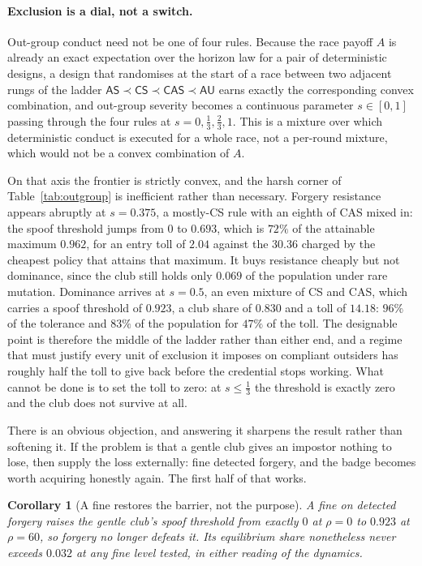 \documentclass[11pt,a4paper]{article}
\newtheorem{corollary}[theorem]{Corollary}
\theoremstyle{definition}
\newcommand{\AS}{\textsf{AS}}
\newcommand{\CS}{\textsf{CS}}
\newcommand{\CAS}{\textsf{CAS}}
\newcommand{\AU}{\textsf{AU}}
\begin{document}
\paragraph{Exclusion is a dial, not a switch.}
Out-group conduct need not be one of four rules. Because the race payoff $A$ is
already an exact expectation over the horizon law for a pair of deterministic
designs, a design that randomises at the start of a race between two adjacent
rungs of the ladder $\AS \prec \CS \prec \CAS \prec \AU$ earns exactly the
corresponding convex combination, and out-group severity becomes a continuous
parameter $s \in [0,1]$ passing through the four rules at
$s = 0, \tfrac{1}{3}, \tfrac{2}{3}, 1$. This is a mixture over which
deterministic conduct is executed for a whole race, not a per-round mixture,
which would not be a convex combination of $A$.

On that axis the frontier is strictly convex, and the harsh corner of
Table~\ref{tab:outgroup} is inefficient rather than necessary. Forgery
resistance appears abruptly at $s = 0.375$, a mostly-\CS{} rule with an eighth
of \CAS{} mixed in: the spoof threshold jumps from $0$ to $0.693$, which is
$72\%$ of the attainable maximum $0.962$, for an entry toll of $2.04$ against
the $30.36$ charged by the cheapest policy that attains that maximum. It buys
resistance cheaply but not dominance, since the club still holds only $0.069$
of the population under rare mutation. Dominance arrives at $s = 0.5$, an even
mixture of \CS{} and \CAS{}, which carries a spoof threshold of $0.923$, a
club share of $0.830$ and a toll of $14.18$: $96\%$ of the tolerance and
$83\%$ of the population for $47\%$ of the toll. The designable point is
therefore the middle of the ladder rather than either end, and a regime that
must justify every unit of exclusion it imposes on compliant outsiders has
roughly half the toll to give back before the credential stops working. What
cannot be done is to set the toll to zero: at $s \le \tfrac{1}{3}$ the
threshold is exactly zero and the club does not survive at all.

There is an obvious objection, and answering it sharpens the result rather than
softening it. If the problem is that a gentle club gives an impostor nothing to
lose, then supply the loss externally: fine detected forgery, and the badge
becomes worth acquiring honestly again. The first half of that works.

\begin{corollary}[A fine restores the barrier, not the purpose]
\label{cor:rescue}
A fine on detected forgery raises the gentle club's spoof threshold from
exactly $0$ at $\rho = 0$ to $0.923$ at $\rho = 60$, so forgery no longer
defeats it. Its equilibrium share nonetheless never exceeds $0.032$ at any fine
level tested, in either reading of the dynamics.
\end{corollary}
\end{document}
